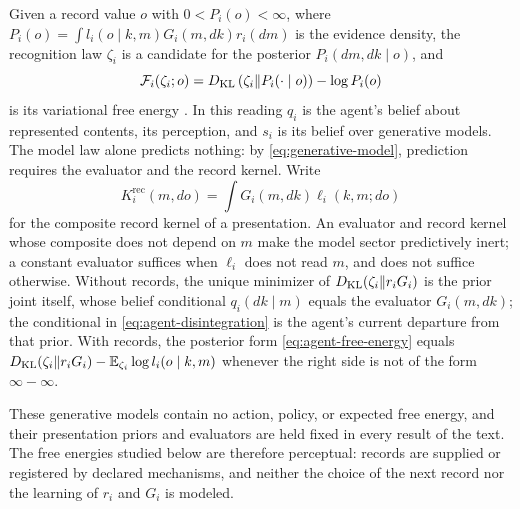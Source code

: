 Given a record value $o$ with $0<P_i(o)<\infty$, where $P_i(o)=\int l_i(o\mid k,m)G_i(m,dk)r_i(dm)$ is the evidence density, the recognition law $\zeta_i$ is a candidate for the posterior $P_i(dm,dk\mid o)$, and
\begin{equation}
 \mathcal F_i(\zeta_i;o)=D_{\mathrm{KL}}\left(\zeta_i\Vert P_i(\cdot\mid o)\right)-\log P_i(o)
 \label{eq:agent-free-energy}
\end{equation}
is its variational free energy \citep{Friston2010,BleiEtAl2017}. In this reading $q_i$ is the agent's belief about represented contents, its perception, and $s_i$ is its belief over generative models. The model law alone predicts nothing: by \cref{eq:generative-model}, prediction requires the evaluator and the record kernel. Write
\begin{equation}
 K_i^{\mathrm{rec}}(m,do)=\int G_i(m,dk)\ell_i(k,m;do)
 \label{eq:composite-record-kernel}
\end{equation}
for the composite record kernel of a presentation. An evaluator and record kernel whose composite does not depend on $m$ make the model sector predictively inert; a constant evaluator suffices when $\ell_i$ does not read $m$, and does not suffice otherwise. Without records, the unique minimizer of $D_{\mathrm{KL}}(\zeta_i\Vert r_iG_i)$ is the prior joint itself, whose belief conditional $q_i(dk\mid m)$ equals the evaluator $G_i(m,dk)$; the conditional in \cref{eq:agent-disintegration} is the agent's current departure from that prior. With records, the posterior form \cref{eq:agent-free-energy} equals $D_{\mathrm{KL}}(\zeta_i\Vert r_iG_i)-\mathbb E_{\zeta_i}\log l_i(o\mid k,m)$ whenever the right side is not of the form $\infty-\infty$.

These generative models contain no action, policy, or expected free energy, and their presentation priors and evaluators are held fixed in every result of the text. The free energies studied below are therefore perceptual: records are supplied or registered by declared mechanisms, and neither the choice of the next record nor the learning of $r_i$ and $G_i$ is modeled.

